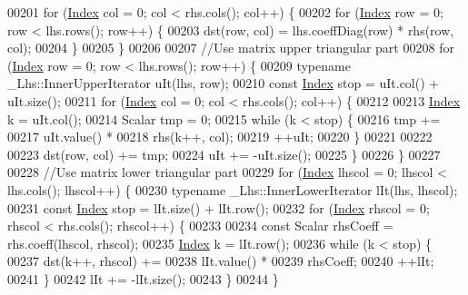 \begin{DoxyCode}
00201     \textcolor{keywordflow}{for} (\hyperlink{namespace_eigen_a62e77e0933482dafde8fe197d9a2cfde}{Index} col = 0; col < rhs.cols(); col++) \{
00202         \textcolor{keywordflow}{for} (\hyperlink{namespace_eigen_a62e77e0933482dafde8fe197d9a2cfde}{Index} row = 0; row < lhs.rows(); row++) \{
00203             dst(row, col) = lhs.coeffDiag(row) * rhs(row, col);
00204         \}
00205     \}
00206 
00207     \textcolor{comment}{//Use matrix upper triangular part}
00208     \textcolor{keywordflow}{for} (\hyperlink{namespace_eigen_a62e77e0933482dafde8fe197d9a2cfde}{Index} row = 0; row < lhs.rows(); row++) \{
00209         \textcolor{keyword}{typename} \_Lhs::InnerUpperIterator uIt(lhs, row);
00210         \textcolor{keyword}{const} \hyperlink{namespace_eigen_a62e77e0933482dafde8fe197d9a2cfde}{Index} stop = uIt.col() + uIt.size();
00211         \textcolor{keywordflow}{for} (\hyperlink{namespace_eigen_a62e77e0933482dafde8fe197d9a2cfde}{Index} col = 0; col < rhs.cols(); col++) \{
00212 
00213             \hyperlink{namespace_eigen_a62e77e0933482dafde8fe197d9a2cfde}{Index} k = uIt.col();
00214             Scalar tmp = 0;
00215             \textcolor{keywordflow}{while} (k < stop) \{
00216                 tmp +=
00217                         uIt.value() *
00218                         rhs(k++, col);
00219                 ++uIt;
00220             \}
00221 
00222 
00223             dst(row, col) += tmp;
00224             uIt += -uIt.size();
00225         \}
00226     \}
00227 
00228     \textcolor{comment}{//Use matrix lower triangular part}
00229     \textcolor{keywordflow}{for} (\hyperlink{namespace_eigen_a62e77e0933482dafde8fe197d9a2cfde}{Index} lhscol = 0; lhscol < lhs.cols(); lhscol++) \{
00230         \textcolor{keyword}{typename} \_Lhs::InnerLowerIterator lIt(lhs, lhscol);
00231         \textcolor{keyword}{const} \hyperlink{namespace_eigen_a62e77e0933482dafde8fe197d9a2cfde}{Index} stop = lIt.size() + lIt.row();
00232         \textcolor{keywordflow}{for} (\hyperlink{namespace_eigen_a62e77e0933482dafde8fe197d9a2cfde}{Index} rhscol = 0; rhscol < rhs.cols(); rhscol++) \{
00233 
00234             \textcolor{keyword}{const} Scalar rhsCoeff = rhs.coeff(lhscol, rhscol);
00235             \hyperlink{namespace_eigen_a62e77e0933482dafde8fe197d9a2cfde}{Index} k = lIt.row();
00236             \textcolor{keywordflow}{while} (k < stop) \{
00237                 dst(k++, rhscol) +=
00238                         lIt.value() *
00239                         rhsCoeff;
00240                 ++lIt;
00241             \}
00242             lIt += -lIt.size();
00243         \}
00244     \}

\end{DoxyCode}
